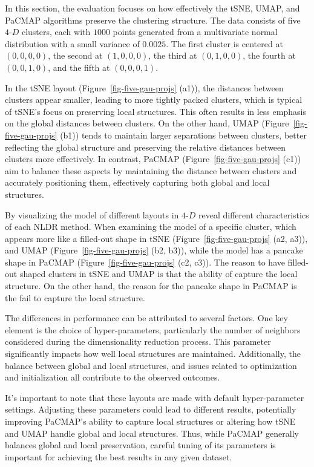 \documentclass[
  12pt]{article}
\begin{document}
In this section, the evaluation focuses on how effectively the tSNE,
UMAP, and PaCMAP algorithms preserve the clustering structure. The data
consists of five \(4\text{-}D\) clusters, each with \(1000\) points
generated from a multivariate normal distribution with a small variance
of \(0.0025\). The first cluster is centered at \((0, 0, 0, 0)\), the
second at \((1, 0, 0, 0)\), the third at \((0, 1, 0, 0)\), the fourth at
\((0, 0, 1, 0)\), and the fifth at \((0, 0, 0, 1)\).

In the tSNE layout (Figure~\ref{fig-five-gau-projs} (a1)), the distances
between clusters appear smaller, leading to more tightly packed
clusters, which is typical of tSNE's focus on preserving local
structures. This often results in less emphasis on the global distances
between clusters. On the other hand, UMAP
(Figure~\ref{fig-five-gau-projs} (b1)) tends to maintain larger
separations between clusters, better reflecting the global structure and
preserving the relative distances between clusters more effectively. In
contrast, PaCMAP (Figure~\ref{fig-five-gau-projs} (c1)) aim to balance
these aspects by maintaining the distance between clusters and
accurately positioning them, effectively capturing both global and local
structures.

By visualizing the model of different layouts in \(4\text{-}D\) reveal
different characteristics of each NLDR method. When examining the model
of a specific cluster, which appears more like a filled-out shape in
tSNE (Figure~\ref{fig-five-gau-projs} (a2, a3)), and UMAP
(Figure~\ref{fig-five-gau-projs} (b2, b3)), while the model has a
pancake shape in PaCMAP (Figure~\ref{fig-five-gau-projs} (c2, c3)). The
reason to have filled-out shaped clusters in tSNE and UMAP is that the
ability of capture the local structure. On the other hand, the reason
for the pancake shape in PaCMAP is the fail to capture the local
structure.

The differences in performance can be attributed to several factors. One
key element is the choice of hyper-parameters, particularly the number
of neighbors considered during the dimensionality reduction process.
This parameter significantly impacts how well local structures are
maintained. Additionally, the balance between global and local
structures, and issues related to optimization and initialization all
contribute to the observed outcomes.

It's important to note that these layouts are made with default
hyper-parameter settings. Adjusting these parameters could lead to
different results, potentially improving PaCMAP's ability to capture
local structures or altering how tSNE and UMAP handle global and local
structures. Thus, while PaCMAP generally balances global and local
preservation, careful tuning of its parameters is important for
achieving the best results in any given dataset.
\end{document}
